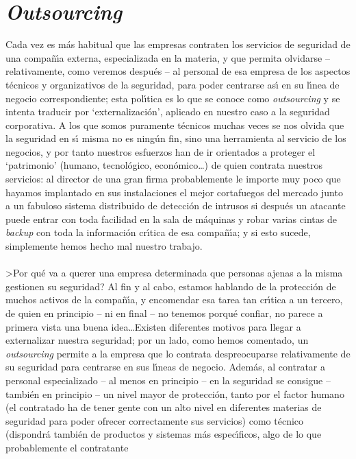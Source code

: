 \section{\it Outsourcing}
Cada vez es m\'as habitual que las empresas contraten los servicios de 
seguridad de una compa\~n\'{\i}a externa, especializada en la materia, y que
permita olvidarse -- relativamente, como veremos despu\'es -- al personal de 
esa empresa de los aspectos t\'ecnicos y organizativos de la seguridad, para 
poder centrarse as\'{\i} en su l\'{\i}nea de negocio correspondiente; esta
pol\'{\i}tica es lo que se conoce como {\it outsourcing} y se intenta traducir
por `externalizaci\'on', aplicado en nuestro
caso a la seguridad corporativa. A los que somos puramente t\'ecnicos muchas 
veces se nos olvida que la seguridad en s\'{\i} misma no es ning\'un fin, sino
una herramienta al servicio de los negocios, y por tanto nuestros esfuerzos han
de ir orientados a proteger el `patrimonio' (humano, tecnol\'ogico, 
econ\'omico\ldots) de quien contrata nuestros servicios: al director de una
gran firma probablemente le importe muy poco que hayamos implantado en sus
instalaciones el mejor cortafuegos del mercado junto a un fabuloso sistema 
distribuido de detecci\'on de intrusos si despu\'es un atacante puede entrar
con toda facilidad en la sala de m\'aquinas y robar varias cintas de {\it 
backup} con toda la informaci\'on cr\'{\i}tica de esa compa\~n\'{\i}a; y si esto
sucede, simplemente hemos hecho mal nuestro trabajo.\\
\\>Por qu\'e va a querer una empresa determinada que personas ajenas a la misma
gestionen su seguridad? Al fin y al cabo, estamos hablando de la protecci\'on
de muchos activos de la compa\~n\'{\i}a, y encomendar esa tarea tan cr\'{\i}tica
a un tercero, de quien en principio -- ni en final -- no tenemos porqu\'e 
confiar, no parece a primera vista una buena idea\ldots Existen diferentes
motivos para llegar a externalizar nuestra seguridad; por un lado, como hemos
comentado, un {\it outsourcing} permite a la empresa que lo contrata 
despreocuparse relativamente de su seguridad para centrarse en sus l\'{\i}neas
de negocio. Adem\'as, al contratar a personal especializado -- al menos en 
principio -- en la seguridad se consigue -- tambi\'en en principio -- un nivel
mayor de protecci\'on, tanto por el factor humano (el contratado ha de tener
gente con un alto nivel en diferentes materias de seguridad para poder ofrecer
correctamente sus servicios) como t\'ecnico (dispondr\'a tambi\'en de productos
y sistemas m\'as espec\'{\i}ficos, algo de lo que probablemente el contratante 

